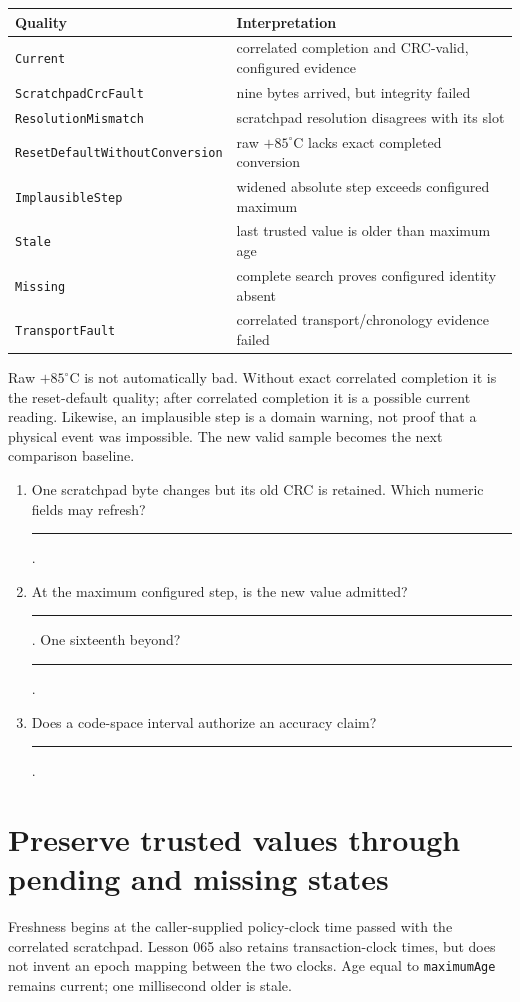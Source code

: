 \documentclass[10pt]{article}
\newcommand{\blankline}{\rule{0.76in}{0.4pt}}
\begin{document}
\begin{tabularx}{\linewidth}{@{}l X@{}}
\toprule
Quality & Interpretation\\
\midrule
\texttt{Current} & correlated completion and CRC-valid, configured evidence\\
\texttt{ScratchpadCrcFault} & nine bytes arrived, but integrity failed\\
\texttt{ResolutionMismatch} & scratchpad resolution disagrees with its slot\\
\texttt{ResetDefaultWithoutConversion} & raw \(+85^\circ\mathrm{C}\) lacks exact completed conversion\\
\texttt{ImplausibleStep} & widened absolute step exceeds configured maximum\\
\texttt{Stale} & last trusted value is older than maximum age\\
\texttt{Missing} & complete search proves configured identity absent\\
\texttt{TransportFault} & correlated transport/chronology evidence failed\\
\bottomrule
\end{tabularx}

Raw \(+85^\circ\mathrm{C}\) is not automatically bad. Without exact correlated
completion it is the reset-default quality; after correlated completion it is
a possible current reading. Likewise, an implausible step is a domain warning,
not proof that a physical event was impossible. The new valid sample becomes
the next comparison baseline.

\begin{enumerate}
 \item One scratchpad byte changes but its old CRC is retained. Which numeric
       fields may refresh? \blankline.
 \item At the maximum configured step, is the new value admitted?
       \blankline. One sixteenth beyond? \blankline.
 \item Does a code-space interval authorize an accuracy claim? \blankline.
\end{enumerate}

\newpage
\section{Preserve trusted values through pending and missing states}
Freshness begins at the caller-supplied policy-clock time passed with the
correlated scratchpad. Lesson 065 also retains transaction-clock times, but
does not invent an epoch mapping between the two clocks. Age equal to
\texttt{maximumAge} remains current; one millisecond older is stale.
\end{document}
